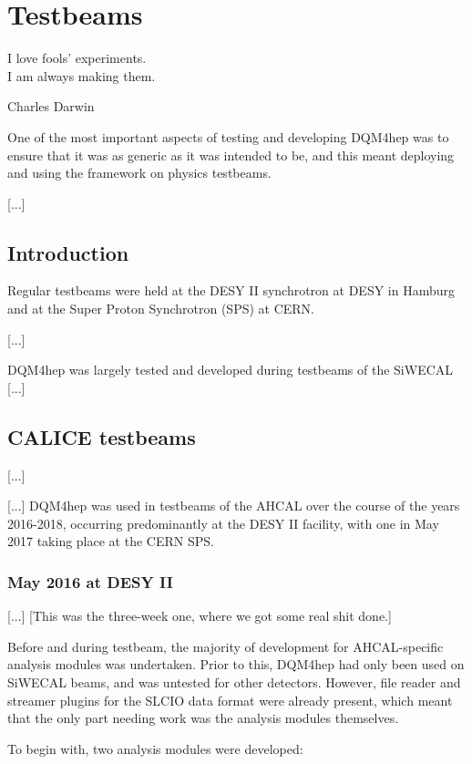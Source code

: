 \chapter{Testbeams}

\epigraph{I love fools' experiments. \\I am always making them.}{Charles Darwin}

One of the most important aspects of testing and developing DQM4hep was to ensure that it was as generic as it was intended to be, and this meant deploying and using the framework on physics testbeams.


[...]

\section{Introduction}

Regular testbeams were held at the DESY II synchrotron at DESY in Hamburg and at the Super Proton Synchrotron (SPS) at CERN. 

[...]

DQM4hep was largely tested and developed during testbeams of the SiWECAL [...]

\section{CALICE testbeams}
[...]

[...] DQM4hep was used in testbeams of the AHCAL over the course of the years 2016-2018, occurring predominantly at the DESY II facility, with one in May 2017 taking place at the CERN SPS.

\subsection{May 2016 at DESY II}
[...] [This was the three-week one, where we got some real shit done.]

Before and during testbeam, the majority of development for AHCAL-specific analysis modules was undertaken. Prior to this, DQM4hep had only been used on SiWECAL beams, and was untested for other detectors. However, file reader and streamer plugins for the SLCIO data format were already present, which meant that the only part needing work was the analysis modules themselves.

To begin with, two analysis modules were developed: 

